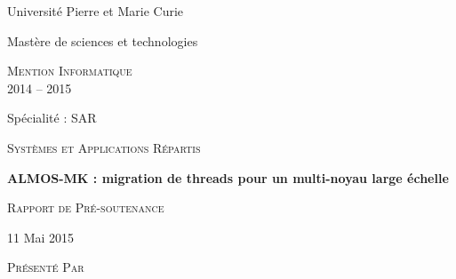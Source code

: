 \begin{titlepage}  

  {\begin{center}\huge\textsf{Université Pierre et Marie Curie}\end{center}}


  \vspace{0.4cm}
  

  {\begin{center}\huge\textsf{Mastère de sciences et technologies}\end{center}}
  
  \vspace{0.4cm}
  
  {\begin{center}\huge\textsc{Mention Informatique \\2014 -- 2015} \end{center}}
  
  \vspace{0.4cm}
  
  {\begin{center}\huge\textsf{Spécialité : SAR}\end{center}}
  
  {\begin{center}\large\textsc{Systèmes et Applications Répartis }\end{center}}
  
  \vspace{0.4cm}

  {\begin{center}\Huge\textbf{ALMOS-MK : migration de threads pour un
        multi-noyau large échelle}\end{center}}
  
  \vspace{0.4cm}
  
  {\begin{center}\huge\textsc{Rapport de Pré-soutenance}\end{center}}
  
  \vspace{0.4cm}
  
  {\begin{center}\large\textsf {11 Mai 2015 }\end{center}}
  
  \vspace{0.4cm}
  
  {\begin{center}\Large\textsc{Présenté Par}\end{center}}
  

\end{titlepage}
